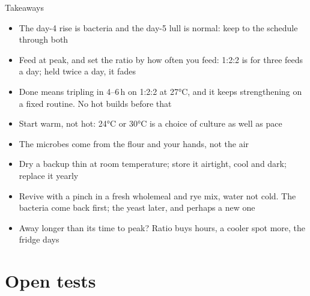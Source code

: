 \documentclass[aspectratio=169,11pt]{beamer}
\begin{document}
\begin{frame}{Takeaways}
  \small
  \begin{itemize}
    \item The day-4 rise is bacteria and the day-5 lull is normal: keep to the schedule through both
    \item Feed at peak, and set the ratio by how often you feed: 1:2:2 is for three feeds a day; held twice a day, it fades
    \item Done means tripling in 4--6\,h on 1:2:2 at 27°C, and it keeps strengthening on a fixed routine. No hot builds before that
    \item Start warm, not hot: 24°C or 30°C is a choice of culture as well as pace
    \item The microbes come from the flour and your hands, not the air
    \item Dry a backup thin at room temperature; store it airtight, cool and dark; replace it yearly
    \item Revive with a pinch in a fresh wholemeal and rye mix, water not cold. The bacteria come back first; the yeast later, and perhaps a new one
    \item Away longer than its time to peak? Ratio buys hours, a cooler spot more, the fridge days
  \end{itemize}
\end{frame}

\section{Open tests}
\end{document}
